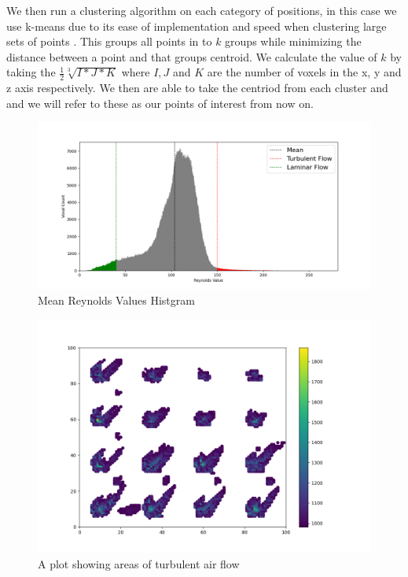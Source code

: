  We then run a clustering algorithm on each category of positions, in this case we use k-means due to its ease of implementation and speed when clustering large sets of points \cite{HDBScan}. This groups all points in to \ensuremath{k} groups while minimizing the distance between a point and that groups centroid. We calculate the value of \ensuremath{k} by taking the \ensuremath{\frac{1}{2}\sqrt[3]{I*J*K}} where \ensuremath{I,J} and \ensuremath{K} are the number of voxels in the x, y and z axis respectively. We then are able to take the centriod from each cluster and and we will refer to these as our points of interest from now on.

\begin{figure}
\centering
\includegraphics[scale=.25]{Figures/MethodsGraph.png}
\decoRule
\caption[A histogram]{Mean Reynolds Values Histgram}
\label{fig:MHistgram}
\end{figure}

\begin{figure}
\centering
\includegraphics[scale=.25]{Figures/Turb2d.png}
\decoRule
\caption[Turbulent Air Flow Skatter Plot]{A plot showing areas of turbulent air flow}
\label{fig:MTurbulentflow}
\end{figure}
